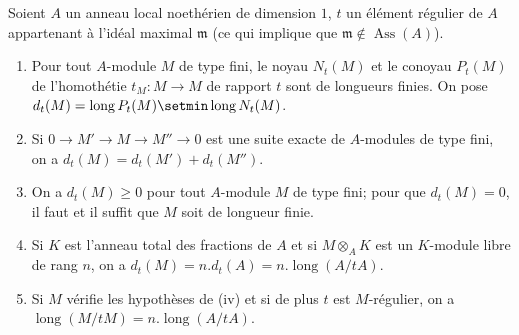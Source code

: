 \begin{lemma}[21.10.13]
\label{IV.21.10.13}
Soient $A$ un anneau local noethérien de dimension $1$, $t$ un élément régulier de $A$ appartenant à l'idéal maximal $\mathfrak{m}$ (ce qui implique que $\mathfrak{m}\notin\operatorname{Ass}(A)$).
\begin{enumerate}[label=\textup{(\roman*)}]
  \item Pour tout $A$-module $M$ de type fini, le noyau $N_t(M)$ et le conoyau $P_t(M)$ de l'homothétie $t_M:M\to M$ de rapport $t$ sont de longueurs finies. On pose $d_t(M)=\operatorname{long}P_t(M)\setmin\operatorname{long}N_t(M)$.
  \item Si $0\to M'\to M\to M''\to0$ est une suite exacte de $A$-modules de type fini, on a $d_t(M)=d_t(M')+d_t(M'')$.
  \item On a $d_t(M)\geq0$ pour tout $A$-module $M$ de type fini; pour que $d_t(M)=0$, il faut et il suffit que $M$ soit de longueur finie.
  \item Si $K$ est l'anneau total des fractions de $A$ et si $M\otimes_AK$ est un $K$-module libre de rang $n$, on a $d_t(M)=n.d_t(A)=n.\operatorname{long}(A/tA)$.
  \item Si $M$ vérifie les hypothèses de \textup{(iv)} et si de plus $t$ est $M$-régulier, on a $\operatorname{long}(M/tM)=n.\operatorname{long}(A/tA)$.
\end{enumerate}
\end{lemma}


